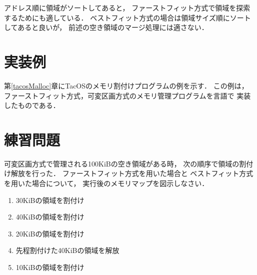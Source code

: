 \begin{itemize}
  アドレス順に領域がソートしてあると，
  ファーストフィット方式で領域を探索するためにも適している．
  ベストフィット方式の場合は領域サイズ順にソートしてあると良いが，
  前述の空き領域のマージ処理には適さない．
\end{itemize}

\section{実装例}
第\ref{tacosMalloc}章にTacOSのメモリ割付けプログラムの例を示す．
この例は，
ファーストフィット方式，可変区画方式のメモリ管理プログラムを{\cmm}言語で
実装したものである．

\section*{練習問題}
可変区画方式で管理される100KiBの空き領域がある時，
次の順序で領域の割付け解放を行った．
ファーストフィット方式を用いた場合と
ベストフィット方式を用いた場合について，
実行後のメモリマップを図示しなさい．

\begin{enumerate}
  \renewcommand{\labelenumi}{\ttfamily\arabic{chapter}.\arabic{enumi}}
  \setlength{\leftskip}{1em}
\item 30KiBの領域を割付け
\item 40KiBの領域を割付け
\item 20KiBの領域を割付け
\item 先程割付けた40KiBの領域を解放
\item 10KiBの領域を割付け
\end{enumerate}
